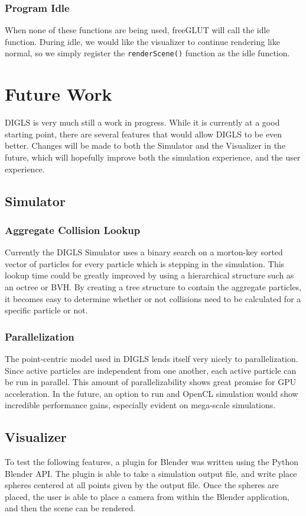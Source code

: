 \documentclass[fleqn,10pt]{UserGuideArx} %
\begin{document}
\subsubsection{Program Idle}
    When none of these functions are being used, freeGLUT will call the idle function. During idle, we would like the visualizer to continue rendering like normal, so we simply register the \texttt{renderScene()} function as the idle function.\\

\section{Future Work}
DIGLS is very much still a work in progress. While it is currently at a good starting point, there are several features that would allow DIGLS to be even better. Changes will be made to both the Simulator and the Visualizer in the future, which will hopefully improve both the simulation experience, and the user experience.
\subsection{Simulator}
\subsubsection{Aggregate Collision Lookup}
Currently the DIGLS Simulator uses a binary search on a morton-key sorted vector of particles for every particle which is stepping in the simulation. This lookup time could be greatly improved by using a hierarchical structure such as an octree or BVH. By creating a tree structure to contain the aggregate particles, it becomes easy to determine whether or not collisions need to be calculated for a specific particle or not.

\subsubsection{Parallelization}
The point-centric model used in DIGLS lends itself very nicely to parallelization. Since active particles are independent from one another, each active particle can be run in parallel. This amount of parallelizability shows great promise for GPU acceleration. In the future, an option to run and OpenCL simulation would show incredible performance gains, especially evident on mega-scale simulations.

\subsection{Visualizer}
To test the following features, a plugin for Blender was written using the Python Blender API. The plugin is able to take a simulation output file, and write place spheres centered at all points given by the output file. Once the spheres are placed, the user is able to place a camera from within the Blender application, and then the scene can be rendered.
\end{document}
